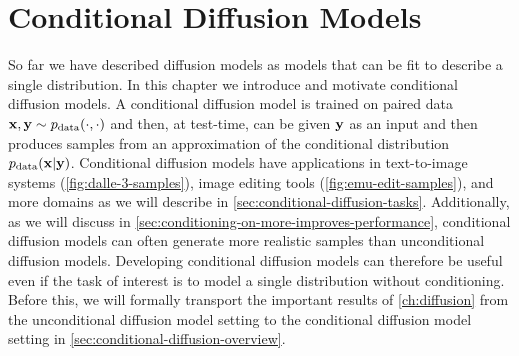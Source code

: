 \chapter{Conditional Diffusion Models} \label{ch:conditional-diffusion}

So far we have described diffusion models as models that can be fit to describe a single distribution. In this chapter we introduce and motivate conditional diffusion models. A conditional diffusion model is trained on paired data ${\mathbf{x}}, {\mathbf{y}} \sim p_\text{data}(\cdot, \cdot)$ and then, at test-time, can be given ${\mathbf{y}}$ as an input and then produces samples from an approximation of the conditional distribution $p_\text{data}({\mathbf{x}}|{\mathbf{y}})$. Conditional diffusion models have applications in text-to-image systems (\cref{fig:dalle-3-samples}), image editing tools (\cref{fig:emu-edit-samples}), and more domains as we will describe in \cref{sec:conditional-diffusion-tasks}. Additionally, as we will discuss in \cref{sec:conditioning-on-more-improves-performance}, conditional diffusion models can often generate more realistic samples than unconditional diffusion models. Developing conditional diffusion models can therefore be useful even if the task of interest is to model a single distribution without conditioning. Before this, we will formally transport the important results of \cref{ch:diffusion} from the unconditional diffusion model setting to the conditional diffusion model setting in \cref{sec:conditional-diffusion-overview}.


